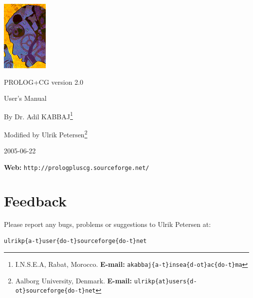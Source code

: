 \documentclass{book}
\begin{document}
\begin{titlepage}
\begin{center}

\includegraphics{ImgPrlg.png}

\vspace{0.7cm}

{\Huge PROLOG+CG version 2.0}

\vspace{1.5cm}

{\huge User's Manual}

\vspace{1.5cm}

{\Large By Dr. Adil KABBAJ\footnote{I.N.S.E.A, Rabat, Morocco. {\bf E-mail:} \texttt{akabbaj\{a-t\}insea\{d-ot\}ac\{do-t\}ma}}}

\bigskip

{\Large Modified by Ulrik Petersen\footnote{Aalborg University, Denmark. {\bf E-mail:} \texttt{ulrikp\{at\}users\{d-ot\}sourceforge\{do-t\}net}}}

\vspace{1.6cm}

2005-06-22

\vspace{1.6cm}

{\large {\bf Web:} \texttt{http://prologpluscg.sourceforge.net/}}

\end{center}
\end{titlepage}


\tableofcontents{}

\vspace{2cm}

\section*{Feedback}

Please report any bugs, problems or suggestions to Ulrik Petersen at:

\begin{center}
\texttt{ulrikp\{a-t\}user\{do-t\}sourceforge\{do-t\}net}
\end{center}
\end{document}
